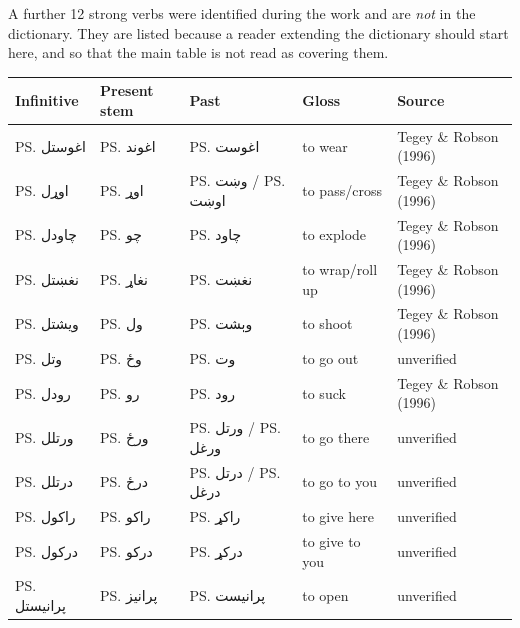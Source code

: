 A further 12 strong verbs were identified during the work and are \emph{not} in the dictionary. They are listed because a reader extending the dictionary should start here, and so that the main table is not read as covering them.

\footnotesize
\begin{longtable}{lllll}
\toprule
Infinitive & Present stem & Past & Gloss & Source\\
\midrule
\ps{اغوستل} & \ps{اغوند} & \ps{اغوست} & to wear & Tegey \& Robson (1996)\\
\ps{اوړل} & \ps{اوړ} & \ps{وښت} / \ps{اوښت} & to pass/cross & Tegey \& Robson (1996)\\
\ps{چاودل} & \ps{چو} & \ps{چاود} & to explode & Tegey \& Robson (1996)\\
\ps{نغښتل} & \ps{نغاړ} & \ps{نغښت} & to wrap/roll up & Tegey \& Robson (1996)\\
\ps{ویشتل} & \ps{ول} & \ps{وېشت} & to shoot & Tegey \& Robson (1996)\\
\ps{وتل} & \ps{وځ} & \ps{وت} & to go out & unverified\\
\ps{رودل} & \ps{رو} & \ps{رود} & to suck & Tegey \& Robson (1996)\\
\ps{ورتلل} & \ps{ورځ} & \ps{ورتل} / \ps{ورغل} & to go there & unverified\\
\ps{درتلل} & \ps{درځ} & \ps{درتل} / \ps{درغل} & to go to you & unverified\\
\ps{راکول} & \ps{راکو} & \ps{راکړ} & to give here & unverified\\
\ps{درکول} & \ps{درکو} & \ps{درکړ} & to give to you & unverified\\
\ps{پرانیستل} & \ps{پرانیز} & \ps{پرانیست} & to open & unverified\\
\bottomrule
\end{longtable}
\normalsize
